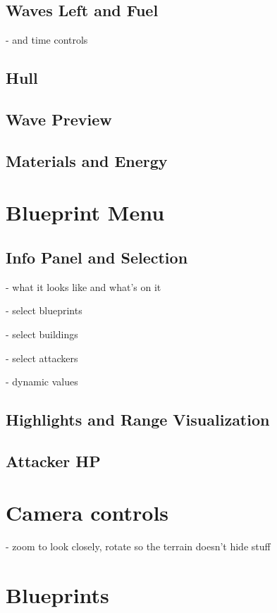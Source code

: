 \subsection{Waves Left and Fuel}

- and time controls

\subsection{Hull}

\subsection{Wave Preview}

\subsection{Materials and Energy}

\section{Blueprint Menu}

\subsection{Info Panel and Selection}

- what it looks like and what's on it

- select blueprints

- select buildings

- select attackers

- dynamic values

\subsection{Highlights and Range Visualization}

\subsection{Attacker HP}

\section{Camera controls}

- zoom to look closely, rotate so the terrain doesn't hide stuff

\section{Blueprints}

